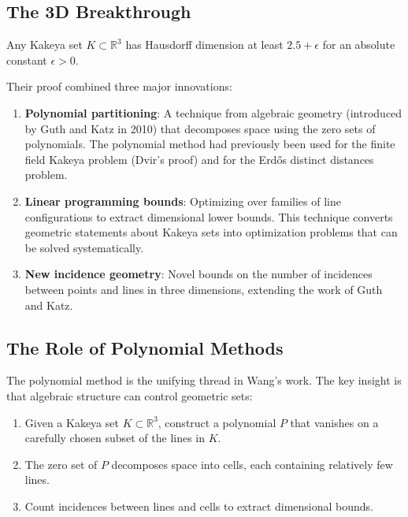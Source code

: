 \subsection{The 3D Breakthrough}

\begin{theorem}
Any Kakeya set $K \subset \mathbb{R}^3$ has Hausdorff dimension at least $2.5 + \epsilon$ for an absolute constant $\epsilon > 0$.
\end{theorem}

Their proof combined three major innovations:

\begin{enumerate}
\item \textbf{Polynomial partitioning}: A technique from algebraic geometry (introduced by Guth and Katz in 2010) that decomposes space using the zero sets of polynomials. The polynomial method had previously been used for the finite field Kakeya problem (Dvir's proof) and for the Erd\H{o}s distinct distances problem.
\item \textbf{Linear programming bounds}: Optimizing over families of line configurations to extract dimensional lower bounds. This technique converts geometric statements about Kakeya sets into optimization problems that can be solved systematically.
\item \textbf{New incidence geometry}: Novel bounds on the number of incidences between points and lines in three dimensions, extending the work of Guth and Katz.
\end{enumerate}

\subsection{The Role of Polynomial Methods}

The polynomial method is the unifying thread in Wang's work. The key insight is that algebraic structure can control geometric sets:

\begin{enumerate}
\item Given a Kakeya set $K \subset \mathbb{R}^3$, construct a polynomial $P$ that vanishes on a carefully chosen subset of the lines in $K$.
\item The zero set of $P$ decomposes space into cells, each containing relatively few lines.
\item Count incidences between lines and cells to extract dimensional bounds.
\end{enumerate}

